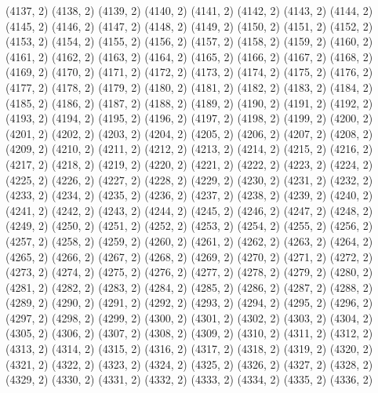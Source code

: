 {   (4137, 2)
   (4138, 2)
   (4139, 2)
   (4140, 2)
   (4141, 2)
   (4142, 2)
   (4143, 2)
   (4144, 2)
   (4145, 2)
   (4146, 2)
   (4147, 2)
   (4148, 2)
   (4149, 2)
   (4150, 2)
   (4151, 2)
   (4152, 2)
   (4153, 2)
   (4154, 2)
   (4155, 2)
   (4156, 2)
   (4157, 2)
   (4158, 2)
   (4159, 2)
   (4160, 2)
   (4161, 2)
   (4162, 2)
   (4163, 2)
   (4164, 2)
   (4165, 2)
   (4166, 2)
   (4167, 2)
   (4168, 2)
   (4169, 2)
   (4170, 2)
   (4171, 2)
   (4172, 2)
   (4173, 2)
   (4174, 2)
   (4175, 2)
   (4176, 2)
   (4177, 2)
   (4178, 2)
   (4179, 2)
   (4180, 2)
   (4181, 2)
   (4182, 2)
   (4183, 2)
   (4184, 2)
   (4185, 2)
   (4186, 2)
   (4187, 2)
   (4188, 2)
   (4189, 2)
   (4190, 2)
   (4191, 2)
   (4192, 2)
   (4193, 2)
   (4194, 2)
   (4195, 2)
   (4196, 2)
   (4197, 2)
   (4198, 2)
   (4199, 2)
   (4200, 2)
   (4201, 2)
   (4202, 2)
   (4203, 2)
   (4204, 2)
   (4205, 2)
   (4206, 2)
   (4207, 2)
   (4208, 2)
   (4209, 2)
   (4210, 2)
   (4211, 2)
   (4212, 2)
   (4213, 2)
   (4214, 2)
   (4215, 2)
   (4216, 2)
   (4217, 2)
   (4218, 2)
   (4219, 2)
   (4220, 2)
   (4221, 2)
   (4222, 2)
   (4223, 2)
   (4224, 2)
   (4225, 2)
   (4226, 2)
   (4227, 2)
   (4228, 2)
   (4229, 2)
   (4230, 2)
   (4231, 2)
   (4232, 2)
   (4233, 2)
   (4234, 2)
   (4235, 2)
   (4236, 2)
   (4237, 2)
   (4238, 2)
   (4239, 2)
   (4240, 2)
   (4241, 2)
   (4242, 2)
   (4243, 2)
   (4244, 2)
   (4245, 2)
   (4246, 2)
   (4247, 2)
   (4248, 2)
   (4249, 2)
   (4250, 2)
   (4251, 2)
   (4252, 2)
   (4253, 2)
   (4254, 2)
   (4255, 2)
   (4256, 2)
   (4257, 2)
   (4258, 2)
   (4259, 2)
   (4260, 2)
   (4261, 2)
   (4262, 2)
   (4263, 2)
   (4264, 2)
   (4265, 2)
   (4266, 2)
   (4267, 2)
   (4268, 2)
   (4269, 2)
   (4270, 2)
   (4271, 2)
   (4272, 2)
   (4273, 2)
   (4274, 2)
   (4275, 2)
   (4276, 2)
   (4277, 2)
   (4278, 2)
   (4279, 2)
   (4280, 2)
   (4281, 2)
   (4282, 2)
   (4283, 2)
   (4284, 2)
   (4285, 2)
   (4286, 2)
   (4287, 2)
   (4288, 2)
   (4289, 2)
   (4290, 2)
   (4291, 2)
   (4292, 2)
   (4293, 2)
   (4294, 2)
   (4295, 2)
   (4296, 2)
   (4297, 2)
   (4298, 2)
   (4299, 2)
   (4300, 2)
   (4301, 2)
   (4302, 2)
   (4303, 2)
   (4304, 2)
   (4305, 2)
   (4306, 2)
   (4307, 2)
   (4308, 2)
   (4309, 2)
   (4310, 2)
   (4311, 2)
   (4312, 2)
   (4313, 2)
   (4314, 2)
   (4315, 2)
   (4316, 2)
   (4317, 2)
   (4318, 2)
   (4319, 2)
   (4320, 2)
   (4321, 2)
   (4322, 2)
   (4323, 2)
   (4324, 2)
   (4325, 2)
   (4326, 2)
   (4327, 2)
   (4328, 2)
   (4329, 2)
   (4330, 2)
   (4331, 2)
   (4332, 2)
   (4333, 2)
   (4334, 2)
   (4335, 2)
   (4336, 2)
}
